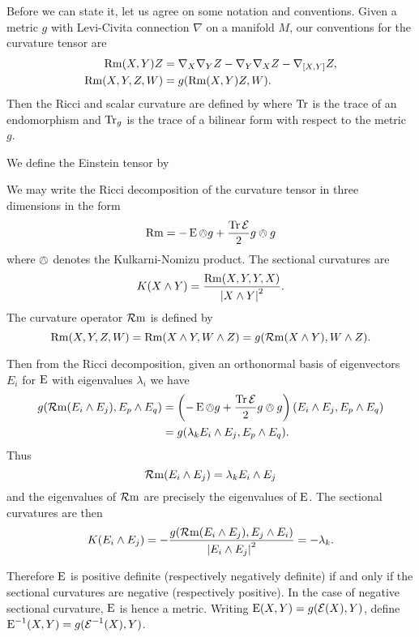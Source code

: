\documentclass[a4paper,12pt]{amsart}
\begin{document}
Before we can state it, let us agree on some notation and conventions. Given a metric \(g\) with Levi-Civita connection $\nabla$ on a manifold $M$, our conventions for the curvature tensor are
\[
\begin{split}
\operatorname{Rm}(X, Y) Z &= \nabla_X \nabla_Y Z - \nabla_Y \nabla_X Z - \nabla_{[X, Y]} Z, \\
\operatorname{Rm}(X, Y, Z, W) &= g(\operatorname{Rm}(X, Y) Z, W).
\end{split}
\]
Then the Ricci and scalar curvature are defined by
where $\operatorname{Tr}$ is the trace of an endomorphism and $\operatorname{Tr}_{g}$ is the trace of a bilinear form with respect to the metric $g$.

We define the Einstein tensor by

We may write the Ricci decomposition of the curvature tensor in three dimensions in the form
\[
\operatorname{Rm} = -\operatorname{E} \owedge g + \frac{\operatorname{Tr} \operatorname{\mathcal{E}}}{2} g \owedge g
\]
where \(\owedge\) denotes the Kulkarni-Nomizu product. The sectional curvatures are
\[
K(X \wedge Y) = \frac{\operatorname{Rm}(X, Y, Y, X)}{\left\lvert{X \wedge Y}\right\rvert^2}.
\]
The curvature operator \(\operatorname{\mathcal{R}m}\) is defined by
\[
\operatorname{Rm}(X, Y, Z, W) = \operatorname{Rm}(X \wedge Y, W \wedge Z) = g(\operatorname{\mathcal{R}m}(X \wedge Y), W \wedge Z).
\]

Then from the Ricci decomposition, given an orthonormal basis of eigenvectors \(E_i\) for \(\operatorname{E}\) with eigenvalues \(\lambda_i\) we have
\[
\begin{split}
g(\operatorname{\mathcal{R}m}(E_i \wedge E_j), E_p \wedge E_q) &= \left(-\operatorname{E} \owedge g + \frac{\operatorname{Tr} \operatorname{\mathcal{E}}}{2} g \owedge g\right) (E_i \wedge E_j, E_p \wedge E_q) \\
&= g(\lambda_k E_i \wedge E_j, E_p \wedge E_q).
\end{split}
\]
Thus
\[
\operatorname{\mathcal{R}m}(E_i \wedge E_j) = \lambda_k E_i \wedge E_j
\]
and the eigenvalues of \(\operatorname{\mathcal{R}m}\) are precisely the eigenvalues of \(\operatorname{E}\). The sectional curvatures are then
\begin{equation}
\label{eq:sectional}
K (E_i \wedge E_j) = -\frac{g(\operatorname{\mathcal{R}m}(E_i \wedge E_j), E_j \wedge E_i)}{\left\lvert{E_i \wedge E_j}\right\rvert^2} = -\lambda_k.
\end{equation}

Therefore \(\operatorname{E}\) is positive definite (respectively negatively definite) if and only if the sectional curvatures are negative (respectively positive). In the case of negative sectional curvature, \(\operatorname{E}\) is hence a metric. Writing \(\operatorname{E}(X, Y) = g(\operatorname{\mathcal{E}}(X), Y)\), define \(\operatorname{E}^{-1}(X, Y) = g(\operatorname{\mathcal{E}}^{-1} (X), Y)\).
\end{document}
